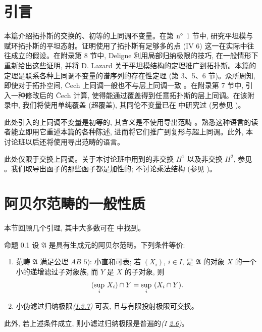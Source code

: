 \section*{引言}

本篇\pageoriginale 介绍拓扑斯的交换的、初等的上同调不变量。在第 ${\rm n^{\circ}}$ 1 节中, 研究平坦模与赋环拓扑斯的平坦态射。证明使用了拓扑斯有足够多的点 (IV 6) 这一在实际中往往成立的假设。在附录第 8 节中, Deligne 利用局部归纳极限的技巧, 在一般情形下重新给出这些证明, 并将 D. Lazard 关于平坦模结构的定理推广到拓扑斯。本篇的定理\sisi{,}{}是联系各种上同调不变量的谱序列的存在性定理 (第 3、5、6 节)。众所周知, 即使对于拓扑空间, Čech 上同调一般也不与层上同调一致 \cite{sga4.exp.V.bib.11}。在附录第 7 节中, 引入一种修改后的 Čech 计算, 使得能通过覆盖得到任意拓扑斯的层上同调。在该附录中, 我们将使用单纯覆盖 (超覆盖), 其同伦不变量已在 \cite{sga4.exp.V.bib.1} 中研究过 (另参见 \cite{sga4.exp.V.bib.17})。

此处引入的上同调不变量是初等的, 其含义是不使用导出范畴 \cite{sga4.exp.V.bib.12}。熟悉这种语言的读者能立即用它重述本篇的各种陈述, 进而将它们推广到复形与超上同调。此外, 本讨论班以后还将使用导出范畴的语言。

此处仅限于交换上同调。关于本讨论班中用到的非交换 $H^1$ 以及非交换 $H^2$, 参见 \cite{sga4.exp.V.bib.9}。我们取导出函子的那些函子都是加性的; 不讨论乘法结构 (参见 \cite{sga4.exp.V.bib.7})。

\setcounter{section}{-1}
\section{阿贝尔范畴的一般性质}

本节\pageoriginale 回顾几个引理, 其中大多数可在 \cite{sga4.exp.V.bib.11} 中找到。

\begin{enonce*}{命题 0.1}
设 $\mathfrak{A}$ 是具有生成元的阿贝尔范畴。下列条件等价:
\begin{enumerate}
\renewcommand{\theenumi}{\roman{enumi}}
\renewcommand{\labelenumi}{\theenumi)}
\item 范畴 $\mathfrak{A}$ 满足公理 $AB$ $5$): 小直和可表; 若 $(X_i)$, $i \in I$, 是 $\mathfrak{A}$ 的对象 $X$ 的一个小的递增滤过子对象族, 而 $Y$ 是 $X$ 的子对象, 则
$$
(\displaystyle{\sup_i}\ X_i) \cap Y = \displaystyle{\sup_i}\ (X_i \cap Y) {}.
$$
\item 小伪滤过归纳极限\emph{(\hyperref[I.def2.7]{I.2.7})} %
可表, 且与有限投射极限可交换。
\end{enumerate}

此外, 若上述条件成立, 则小滤过归纳极限是普遍的\emph{(I \hyperref[I.prop2.6]{2.6})}。
\end{enonce*}

